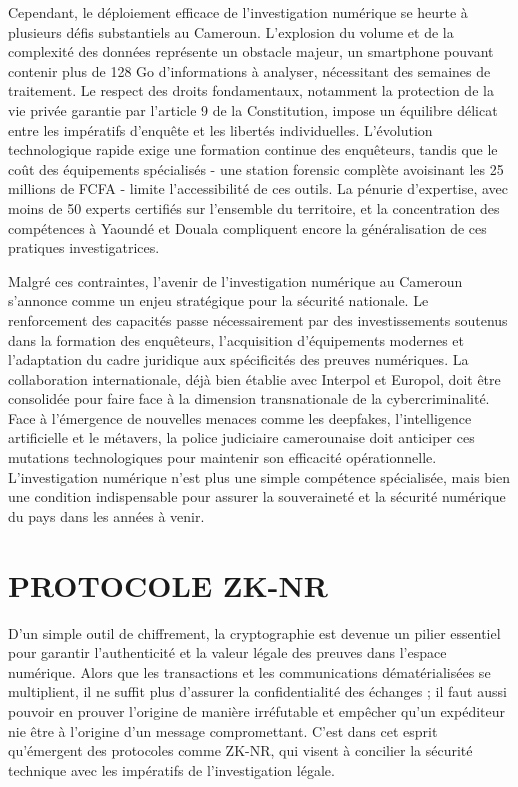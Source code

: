 \documentclass[12pt, a4paper]{article}
\begin{document}
		Cependant, le déploiement efficace de l'investigation numérique se heurte à plusieurs défis substantiels au Cameroun. L'explosion du volume et de la complexité des données représente un obstacle majeur, un smartphone pouvant contenir plus de 128 Go d'informations à analyser, nécessitant des semaines de traitement. Le respect des droits fondamentaux, notamment la protection de la vie privée garantie par l'article 9 de la Constitution, impose un équilibre délicat entre les impératifs d'enquête et les libertés individuelles. L'évolution technologique rapide exige une formation continue des enquêteurs, tandis que le coût des équipements spécialisés - une station forensic complète avoisinant les 25 millions de FCFA - limite l'accessibilité de ces outils. La pénurie d'expertise, avec moins de 50 experts certifiés sur l'ensemble du territoire, et la concentration des compétences à Yaoundé et Douala compliquent encore la généralisation de ces pratiques investigatrices.
		
		Malgré ces contraintes, l'avenir de l'investigation numérique au Cameroun s'annonce comme un enjeu stratégique pour la sécurité nationale. Le renforcement des capacités passe nécessairement par des investissements soutenus dans la formation des enquêteurs, l'acquisition d'équipements modernes et l'adaptation du cadre juridique aux spécificités des preuves numériques. La collaboration internationale, déjà bien établie avec Interpol et Europol, doit être consolidée pour faire face à la dimension transnationale de la cybercriminalité. Face à l'émergence de nouvelles menaces comme les deepfakes, l'intelligence artificielle et le métavers, la police judiciaire camerounaise doit anticiper ces mutations technologiques pour maintenir son efficacité opérationnelle. L'investigation numérique n'est plus une simple compétence spécialisée, mais bien une condition indispensable pour assurer la souveraineté et la sécurité numérique du pays dans les années à venir.
		
		\section{PROTOCOLE ZK-NR}
		
		D'un simple outil de chiffrement, la cryptographie est devenue un pilier essentiel pour garantir l'authenticité et la valeur légale des preuves dans l'espace numérique. Alors que les transactions et les communications dématérialisées se multiplient, il ne suffit plus d'assurer la confidentialité des échanges ; il faut aussi pouvoir en prouver l'origine de manière irréfutable et empêcher qu'un expéditeur nie être à l'origine d'un message compromettant. C'est dans cet esprit qu'émergent des protocoles comme ZK-NR, qui visent à concilier la sécurité technique avec les impératifs de l'investigation légale.
		
\end{document}
